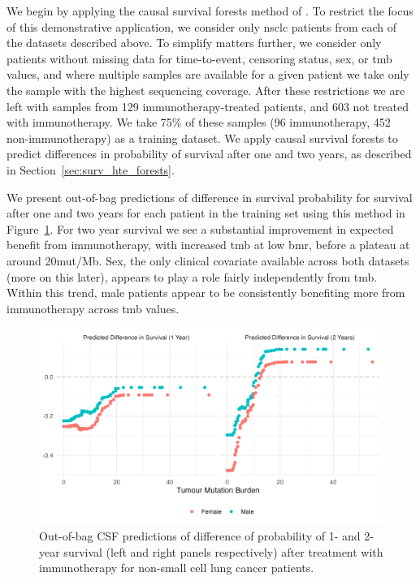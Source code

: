 \documentclass[../thesis.tex]{subfiles}
\begin{document}
We begin by applying the causal survival forests method of \citet{cui_estimating_2022}. To restrict the focus of this demonstrative application, we consider only \gls{nsclc} patients from each of the datasets described above. To simplify matters further, we consider only patients without missing data for time-to-event, censoring status, sex, or \gls{tmb} values, and where multiple samples are available for a given patient we take only the sample with the highest sequencing coverage. After these restrictions we are left with samples from 129 immunotherapy-treated patients, and 603 not treated with immunotherapy. We take 75\% of these samples (96 immunotherapy, 452 non-immunotherapy) as a training dataset. We apply causal survival forests to predict differences in probability of survival after one and two years, as described in Section~\ref{sec:surv_hte_forests}.

We present out-of-bag predictions of difference in survival probability for survival after one and two years for each patient in the training set using this method in Figure~\ref{fig:immuno_train_samples_hte_predictions}. For two year survival we see a substantial improvement in expected benefit from immunotherapy, with increased \gls{tmb} at low \gls{bmr}, before a plateau at around 20mut/Mb. Sex, the only clinical covariate available across both datasets (more on this later), appears to play a role fairly independently from \gls{tmb}. Within this trend, male patients appear to be consistently benefiting more from immunotherapy across \gls{tmb} values.

\begin{figure}[!tpb] 
\centering
\includegraphics[width=\textwidth]{figures/chapter4/immuno_train_samples_hte_predictions.png} 

\caption{Out-of-bag CSF predictions of difference of probability of 1- and 2-year survival (left and right panels respectively) after treatment with immunotherapy for non-small cell lung cancer patients.  \label{fig:immuno_train_samples_hte_predictions}}
\end{figure}
\end{document}
